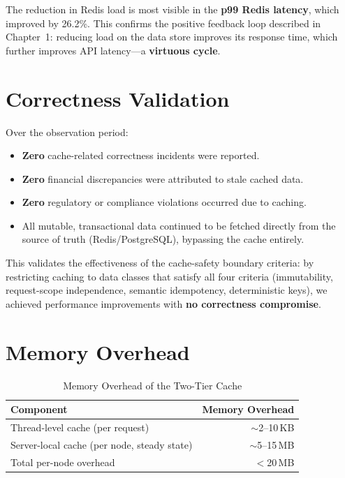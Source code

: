 \documentclass[12pt,a4paper]{report}
\begin{document}
The reduction in Redis load is most visible in the \textbf{p99 Redis latency}, which improved by 26.2\%. This confirms the positive feedback loop described in Chapter~1: reducing load on the data store improves its response time, which further improves API latency—a \textbf{virtuous cycle}.

\section{Correctness Validation}

Over the observation period:

\begin{itemize}
    \item \textbf{Zero} cache-related correctness incidents were reported.
    \item \textbf{Zero} financial discrepancies were attributed to stale cached data.
    \item \textbf{Zero} regulatory or compliance violations occurred due to caching.
    \item All mutable, transactional data continued to be fetched directly from the source of truth (Redis/PostgreSQL), bypassing the cache entirely.
\end{itemize}

This validates the effectiveness of the cache-safety boundary criteria: by restricting caching to data classes that satisfy all four criteria (immutability, request-scope independence, semantic idempotency, deterministic keys), we achieved performance improvements with \textbf{no correctness compromise}.

\section{Memory Overhead}

\begin{table}[h]
\centering
\begin{tabular}{@{} l r @{}}
\toprule
\textbf{Component} & \textbf{Memory Overhead} \\
\midrule
Thread-level cache (per request) & $\sim$2–10\,KB \\
Server-local cache (per node, steady state) & $\sim$5–15\,MB \\
Total per-node overhead & $<$20\,MB \\
\bottomrule
\end{tabular}
\caption{Memory Overhead of the Two-Tier Cache}
\label{tab:memory-overhead}
\end{table}
\end{document}
